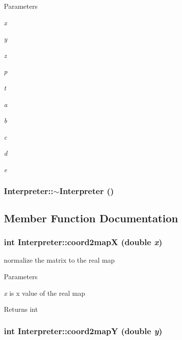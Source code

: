 \begin{DoxyParams}{Parameters}
\item[{\em x}]\item[{\em y}]\item[{\em z}]\item[{\em p}]\item[{\em t}]\item[{\em a}]\item[{\em b}]\item[{\em c}]\item[{\em d}]\item[{\em e}]\end{DoxyParams}
\hypertarget{classInterpreter_a0f96b57f8126e2b5bc63390121e4b5b1}{
\subsubsection[{$\sim$Interpreter}]{\setlength{\rightskip}{0pt plus 5cm}Interpreter::$\sim$Interpreter ()}}
\label{classInterpreter_a0f96b57f8126e2b5bc63390121e4b5b1}


\subsection{Member Function Documentation}
\hypertarget{classInterpreter_a36e1b3f28a3d8dae2155f1f0212bed7d}{
\subsubsection[{coord2mapX}]{\setlength{\rightskip}{0pt plus 5cm}int Interpreter::coord2mapX (double {\em x})}}
\label{classInterpreter_a36e1b3f28a3d8dae2155f1f0212bed7d}


normalize the matrix to the real map 


\begin{DoxyParams}{Parameters}
\item[{\em x}]is x value of the real map \end{DoxyParams}
\begin{DoxyReturn}{Returns}
int 
\end{DoxyReturn}
\hypertarget{classInterpreter_a5b597351a6bdaf23fbf42aed910b151f}{
\subsubsection[{coord2mapY}]{\setlength{\rightskip}{0pt plus 5cm}int Interpreter::coord2mapY (double {\em y})}}
\label{classInterpreter_a5b597351a6bdaf23fbf42aed910b151f}

